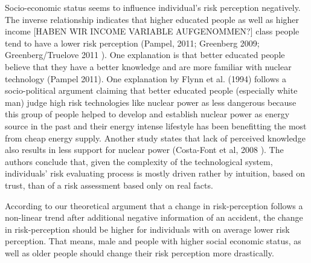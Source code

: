 Socio-economic status seems to influence individual's risk perception negatively. The inverse relationship indicates that higher educated people as well as higher income [HABEN WIR INCOME VARIABLE AUFGENOMMEN?] class people tend to have a lower risk perception (Pampel, 2011; Greenberg 2009; Greenberg/Truelove 2011 \citep{Pampel:2011cx,Greenberg:2009fx,Greenberg:2011ja}).  One explanation is that better educated people believe that they have a better knowledge and are more familiar with nuclear technology (Pampel 2011). One explanation by Flynn et al. (1994) \citep{Flynn:1994dn} follows a socio-political argument claiming that better educated people    (especially white man) judge high risk technologies like nuclear power as less dangerous because this group of people helped to develop and establish nuclear power as energy source in the past and their energy intense lifestyle has been benefitting the most from cheap energy supply. Another study states that lack of perceived knowledge also results in less support for nuclear power  (Costa-Font et al, 2008 \citep{CostaFont:2008hf}).  The authors conclude that, given the complexity of the technological system, individuals' risk evaluating process is mostly driven rather by intuition, based on trust, than of a risk assessment based only on real facts.  

According to our theoretical argument that a change in risk-perception follows a non-linear trend after additional negative information of an accident, the change in risk-perception should be higher for individuals with on average lower risk perception.  That means, male and people with higher social economic status, as well as older people should change their risk perception more drastically. 
 
